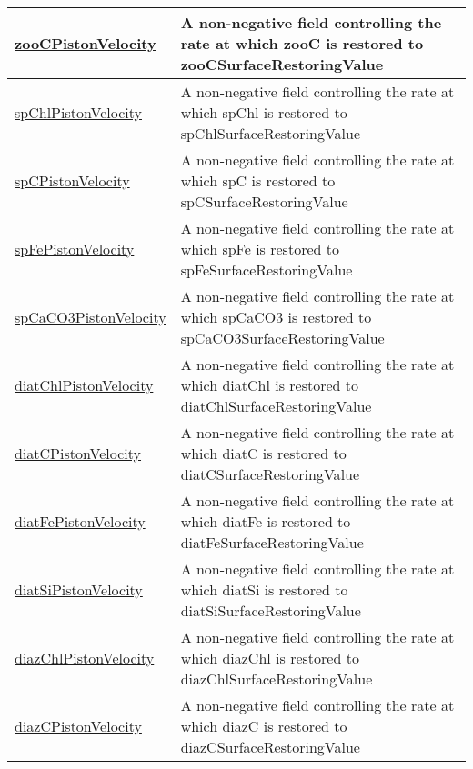 {\begin{center}
\begin{longtable}{| p{2.0in} | p{4.0in} |}
    \hline
    \hyperref[subsec:var_sec_forcing_zooCPistonVelocity]{zooCPistonVelocity} & A non-negative field controlling the rate at which zooC is restored to zooCSurfaceRestoringValue \\
    \hline
    \hyperref[subsec:var_sec_forcing_spChlPistonVelocity]{spChlPistonVelocity} & A non-negative field controlling the rate at which spChl is restored to spChlSurfaceRestoringValue \\
    \hline
    \hyperref[subsec:var_sec_forcing_spCPistonVelocity]{spCPistonVelocity} & A non-negative field controlling the rate at which spC is restored to spCSurfaceRestoringValue \\
    \hline
    \hyperref[subsec:var_sec_forcing_spFePistonVelocity]{spFePistonVelocity} & A non-negative field controlling the rate at which spFe is restored to spFeSurfaceRestoringValue \\
    \hline
    \hyperref[subsec:var_sec_forcing_spCaCO3PistonVelocity]{spCaCO3PistonVelocity} & A non-negative field controlling the rate at which spCaCO3 is restored to spCaCO3SurfaceRestoringValue \\
    \hline
    \hyperref[subsec:var_sec_forcing_diatChlPistonVelocity]{diatChlPistonVelocity} & A non-negative field controlling the rate at which diatChl is restored to diatChlSurfaceRestoringValue \\
    \hline
    \hyperref[subsec:var_sec_forcing_diatCPistonVelocity]{diatCPistonVelocity} & A non-negative field controlling the rate at which diatC is restored to diatCSurfaceRestoringValue \\
    \hline
    \hyperref[subsec:var_sec_forcing_diatFePistonVelocity]{diatFePistonVelocity} & A non-negative field controlling the rate at which diatFe is restored to diatFeSurfaceRestoringValue \\
    \hline
    \hyperref[subsec:var_sec_forcing_diatSiPistonVelocity]{diatSiPistonVelocity} & A non-negative field controlling the rate at which diatSi is restored to diatSiSurfaceRestoringValue \\
    \hline
    \hyperref[subsec:var_sec_forcing_diazChlPistonVelocity]{diazChlPistonVelocity} & A non-negative field controlling the rate at which diazChl is restored to diazChlSurfaceRestoringValue \\
    \hline
    \hyperref[subsec:var_sec_forcing_diazCPistonVelocity]{diazCPistonVelocity} & A non-negative field controlling the rate at which diazC is restored to diazCSurfaceRestoringValue \\
    \hline

\end{longtable}
\end{center}}
